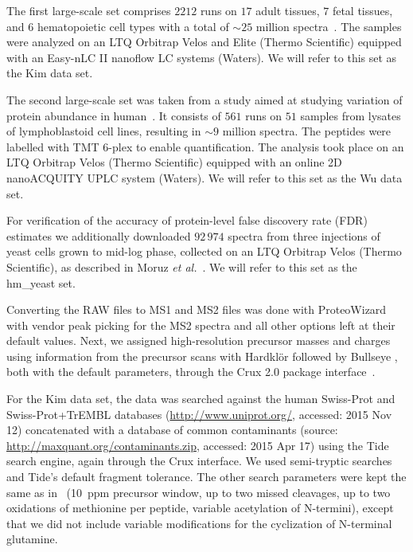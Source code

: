 \documentclass{article}
\begin{document}
The first large-scale set comprises $2212$ runs on $17$ adult tissues,
$7$ fetal tissues, and $6$ hematopoietic cell types with a total of
${\sim}25$ million spectra~\cite{kim2014draft}. The samples were
analyzed on an LTQ Orbitrap Velos and Elite (Thermo Scientific)
equipped with an Easy-nLC II nanoflow LC systems (Waters). We will
refer to this set as the Kim data set.

The second large-scale set was taken from a study aimed at studying
variation of protein abundance in human~\cite{wu2013}. It consists
of $561$ runs on $51$ samples from lysates of lymphoblastoid cell
lines, resulting in ${\sim}9$ million spectra. The peptides were
labelled with TMT 6-plex to enable quantification. The analysis took
place on an LTQ Orbitrap Velos (Thermo Scientific) equipped with an
online 2D nanoACQUITY UPLC system (Waters). We will refer to this set
as the Wu data set.

For verification of the accuracy of protein-level false discovery rate 
(FDR) estimates we additionally downloaded $92\,974$ spectra from 
three injections of yeast cells grown to mid-log phase, collected on 
an LTQ Orbitrap Velos (Thermo Scientific), as described in Moruz {\em 
et al.}~\cite{moruz2013}.  We will refer to this set as the hm\_yeast 
set.

Converting the RAW files to MS1 and MS2 files was done with
ProteoWizard~\cite{kessner2008} with vendor peak picking for the MS2
spectra and all other options left at their default values.  Next, we
assigned high-resolution precursor masses and charges using
information from the precursor scans with Hardkl\"{o}r
\cite{hoopmann2007} followed by Bullseye \cite{hsieh2009}, both with
the default parameters, through the Crux 2.0 package
interface~\cite{mcilwain2014}.

For the Kim data set, the data was searched against the human
Swiss-Prot and Swiss-Prot+TrEMBL databases
(\url{http://www.uniprot.org/}, accessed: 2015 Nov 12)
concatenated with a database of common contaminants (source:
\url{http://maxquant.org/contaminants.zip}, accessed: 2015 Apr 17)
using the Tide search engine, again through the Crux interface. We
used semi-tryptic searches and Tide's default fragment tolerance. The
other search parameters were kept the same as in~\cite{kim2014draft}
(10~ppm precursor window, up to two missed cleavages, up to two
oxidations of methionine per peptide, variable acetylation of
N-termini), except that we did not include variable modifications for
the cyclization of N-terminal glutamine. 
\end{document}
